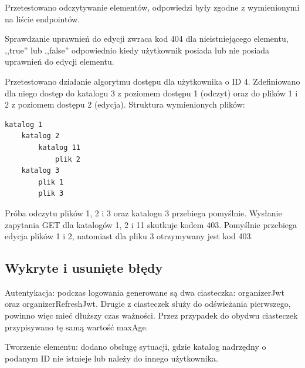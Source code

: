 \documentclass[a4paper,twoside,12pt]{book}
\begin{document}
Przetestowano odczytywanie elementów, odpowiedzi były zgodne z wymienionymi na liście endpointów.

Sprawdzanie uprawnień do edycji zwraca kod 404 dla nieistniejącego elementu, ,,true'' lub ,,false'' odpowiednio kiedy użytkownik posiada lub nie posiada uprawnień do edycji elementu.

Przetestowano działanie algorytmu dostępu dla użytkownika o ID 4. Zdefiniowano dla niego dostęp do katalogu 3 z poziomem dostępu 1 (odczyt) oraz do plików 1 i 2 z poziomem dostępu 2 (edycja). Struktura wymienionych plików:
\begin{verbatim}
katalog 1
	katalog 2
		katalog 11
			plik 2
	katalog 3
		plik 1
		plik 3
\end{verbatim}
Próba odczytu plików 1, 2 i 3 oraz katalogu 3 przebiega pomyślnie. Wysłanie zapytania GET dla katalogów 1, 2 i 11 skutkuje kodem 403. Pomyślnie przebiega edycja plików 1 i 2, natomiast dla pliku 3 otrzymywany jest kod 403.



\subsection{Wykryte i usunięte błędy}

Autentykacja: podczas logowania generowane są dwa ciasteczka: organizerJwt oraz organizerRefreshJwt. Drugie z ciasteczek służy do odświeżania pierwszego, powinno więc mieć dłuższy czas ważności. Przez przypadek do obydwu ciasteczek przypisywano tę samą wartość maxAge.

Tworzenie elementu: dodano obsługę sytuacji, gdzie katalog nadrzędny o podanym ID nie istnieje lub należy do innego użytkownika.
\end{document}
